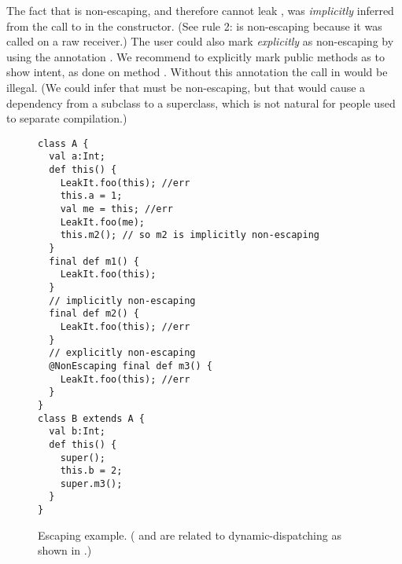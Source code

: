 The fact that  is non-escaping, and therefore cannot leak \this,
    was \emph{implicitly} inferred from the call to 
    in the constructor.
(See rule 2:  is non-escaping because it was called on a raw \this receiver.)
The user could also mark  \emph{explicitly} as non-escaping by using the annotation
    .
We recommend to explicitly mark public methods as  to show intent,
    as done on method .
Without this annotation the call  in  would be illegal.
(We could infer that  must be non-escaping,
    but that would cause a dependency from a subclass to a superclass,
    which is not natural for people used to separate compilation.)


\begin{figure}
\begin{lstlisting}
class A {
  val a:Int;
  def this() {
    LeakIt.foo(this); //err
    this.a = 1;
    val me = this; //err
    LeakIt.foo(me);
    this.m2(); // so m2 is implicitly non-escaping
  }
  final def m1() {
    LeakIt.foo(this);
  }
  // implicitly non-escaping
  final def m2() {
    LeakIt.foo(this); //err
  }
  // explicitly non-escaping
  @NonEscaping final def m3() {
    LeakIt.foo(this); //err
  }
}
class B extends A {
  val b:Int;
  def this() {
    super();
    this.b = 2;
    super.m3();
  }
}
\end{lstlisting}
\caption{Escaping \this example.
    ( and  are related
        to dynamic-dispatching as shown in .)}
\label{Figure:Escaping-this}
\end{figure}




